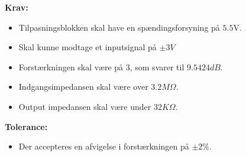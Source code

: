 \noindent\textbf{Krav:}
\begin{itemize}
	\item Tilpasningsblokken skal have en spændingsforsyning på $5.5$V.
	\item Skal kunne modtage et inputsignal på $\pm3V$
	\item Forstærkningen skal være på 3, som svarer til $9.5424dB$.
	\item Indgangsimpedansen skal være over $3.2M\Omega$.
	\item Output impedansen skal være under $32K\Omega$.
\end{itemize}
\noindent\textbf{Tolerance:}
\begin{itemize}
	\item Der accepteres en afvigelse i forstærkningen på $\pm2\%$.
\end{itemize}
